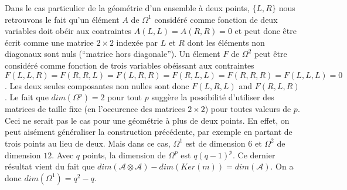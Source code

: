 Dans le cas particulier de la g\'eom\'etrie d'un ensemble \`a deux points, 
 $\{L,R\}$ nous retrouvons le fait qu'un \'el\'ement $A$ de $\Omega^1$ 
 consid\'er\'e comme fonction de deux variables doit ob\'eir aux contraintes 
 $A(L,L)=A(R,R)= 0$ et peut donc \^etre \'ecrit comme une matrice $2 \times 
 2$ index\'ee par $L$ et $R$ dont les \'el\'ements non diagonaux sont 
 nuls (``matrice hors diagonale''). Un \'element $F$ de $\Omega^2$ peut \^etre 
 consid\'er\'e comme fonction de trois variables ob\'eissant aux contraintes
$F(L,L,R)=F(R,R,L)=F(L,R,R)=F(R,L,L)=F(R,R,R)=F(L,L,L)=0$.
 Les deux 
seules composantes non nulles sont donc $F(L,R,L)$ and $F(R,L,R)$. Le 
fait que
$dim(\Omega^p) = 2$ pour tout $p$ sugg\`ere la possibilit\'e d'utiliser 
des matrices de taille fixe (en l'occurence des matrices
$2\times 2$) pour toutes valeurs de $p$.
 Ceci ne serait pas le cas pour 
une g\'eom\'etrie \`a plus de deux points. En effet,
on peut ais\'ement g\'en\'eraliser la construction pr\'ec\'edente, par exemple 
en partant de trois points au lieu de deux. Mais dans ce cas, $\Omega^1$
est de dimension $6$ et
$\Omega^2$ de dimension $12$. Avec $q$ points, la dimension de
$\Omega^p$ est $q(q-1)^p$. Ce dernier r\'esultat vient du fait que 
$dim({\mathcal A}\otimes{\mathcal A}) - dim (Ker(m)) = dim({\mathcal 
A})$. On a donc $dim(\Omega^{1}) = q^{2} - q$.

